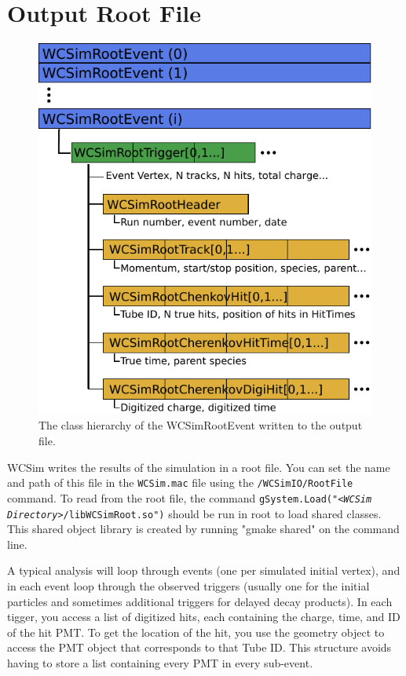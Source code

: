 \section{Output Root File}

\begin{figure}[t!]
  \begin{center}
\includegraphics{rootfile}
  \end{center}
\caption{The class hierarchy of the WCSimRootEvent written to the output file.} \label{fig:rootfile}
\end{figure}

WCSim writes the results of the simulation in a root file. You can set the name and path of this file in the \texttt{WCSim.mac} file using the \texttt{/WCSimIO/RootFile} command.  To read from the root file, the command \texttt{gSystem.Load("<\emph{WCSim Directory}>/libWCSimRoot.so")} should be run in root to load shared classes.  This shared object library is created by running "gmake shared" on the command line.

A typical analysis will loop through events (one per simulated initial vertex), and in each event loop through the observed triggers (usually one for the initial particles and sometimes additional triggers for delayed decay products).  In each tigger, you access a list of digitized hits, each containing the charge, time, and ID of the hit PMT.  To get the location of the hit, you use the geometry object to access the PMT object that corresponds to that Tube ID.  This structure avoids having to store a list containing every PMT in every sub-event.


